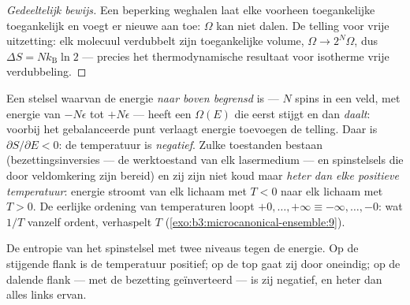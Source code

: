 \begin{proof}[Gedeeltelijk bewijs]
Een beperking weghalen laat elke voorheen toegankelijke 
toegankelijk en voegt er nieuwe aan toe: $\Omega$ kan niet dalen. De
telling voor vrije uitzetting: elk molecuul verdubbelt zijn toegankelijke
volume, $\Omega \to 2^N\Omega$, dus $\Delta S = Nk_{\text{B}}\ln2$ ---
precies het thermodynamische resultaat voor isotherme vrije verdubbeling.
\end{proof}

\begin{example}\label{ex:b3:microcanonical-ensemble:negative}
Een stelsel waarvan de energie \emph{naar boven begrensd} is --- $N$ spins
in een veld, met energie van $-N\epsilon$ tot $+N\epsilon$ --- heeft een
$\Omega(E)$ die eerst stijgt en dan \emph{daalt}: voorbij het gebalanceerde
punt verlaagt energie toevoegen de telling. Daar is $\partial S/\partial E < 0$: de temperatuur is \emph{negatief}. Zulke toestanden bestaan
(bezettingsinversies --- de werktoestand van elk lasermedium --- en
spinstelsels die door veldomkering zijn bereid) en zij zijn niet koud maar
\emph{heter dan elke positieve temperatuur}: energie stroomt van elk
lichaam met $T < 0$ naar elk lichaam met $T > 0$. De eerlijke ordening van
temperaturen loopt $+0, \dots, +\infty \equiv -\infty, \dots, -0$: wat
$1/T$ vanzelf ordent, verhaspelt $T$
(\cref{exo:b3:microcanonical-ensemble:9}).
\end{example}

\begin{omfigure}

{\small De entropie van het spinstelsel met twee niveaus tegen de energie.
Op de stijgende flank is de temperatuur positief; op de top gaat zij door
oneindig; op de dalende flank --- met de bezetting geïnverteerd --- is zij
negatief, en heter dan alles links ervan.}
\end{omfigure}

